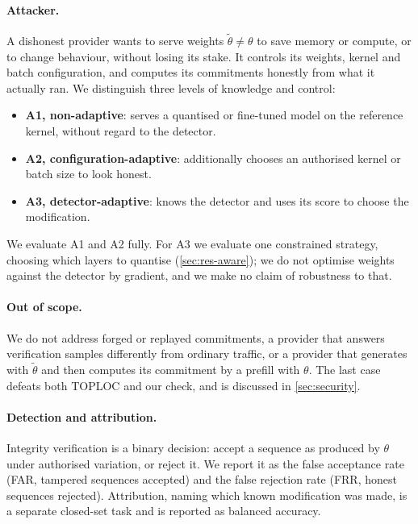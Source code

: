 \documentclass[11pt]{article}
\begin{document}
\paragraph{Attacker.}
A dishonest provider wants to serve weights $\tilde\theta \neq \theta$ to save memory or compute, or to change behaviour, without losing its stake.
It controls its weights, kernel and batch configuration, and computes its commitments honestly from what it actually ran.
We distinguish three levels of knowledge and control:
\begin{itemize}
  \item \textbf{A1, non-adaptive}: serves a quantised or fine-tuned model on the reference kernel, without regard to the detector.
  \item \textbf{A2, configuration-adaptive}: additionally chooses an authorised kernel or batch size to look honest.
  \item \textbf{A3, detector-adaptive}: knows the detector and uses its score to choose the modification.
\end{itemize}
We evaluate A1 and A2 fully. For A3 we evaluate one constrained strategy, choosing which layers to quantise (\cref{sec:res-aware}); we do not optimise weights against the detector by gradient, and we make no claim of robustness to that.

\paragraph{Out of scope.}
We do not address forged or replayed commitments, a provider that answers verification samples differently from ordinary traffic, or a provider that generates with $\tilde\theta$ and then computes its commitment by a prefill with $\theta$.
The last case defeats both TOPLOC and our check, and is discussed in \cref{sec:security}.

\paragraph{Detection and attribution.}
Integrity verification is a binary decision: accept a sequence as produced by $\theta$ under authorised variation, or reject it.
We report it as the false acceptance rate (FAR, tampered sequences accepted) and the false rejection rate (FRR, honest sequences rejected).
Attribution, naming which known modification was made, is a separate closed-set task and is reported as balanced accuracy.

\end{document}

